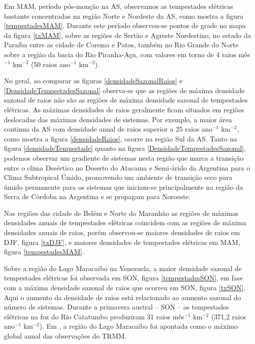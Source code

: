 Em MAM, período pós-monção na AS, observamos as tempestades elétricas bastante concentradas na região Norte e Nordeste da AS, como mostra a figura \ref{tempestadesMAM}. Durante este período observou-se pontos de grade no mapa da figura \ref{txMAM}, sobre as regiões de Sertão e Agreste Nordestino, no estado da Paraíba entre as cidade de Corema e Patos, também no Rio Grande do Norte sobre a região da bacia do Rio Piranha-Açu, com valores em torno de 4 raios mês$^{-1}$ km$^{-2}$ (50 raios ano$^{-1}$ km$^{-2}$).



No geral, ao comparar as figuras \ref{densidadeSazonalRaios} e \ref{DensidadeTempestadesSazonal} observa-se que as regiões de máxima densidade sazonal de raios não são as regiões de máxima densidade sazonal de tempestades elétricas. As máximas densidades de raios geralmente ficam situados em regiões deslocadas das máximas densidades de sistemas. Por exemplo, a maior área continua da AS com densidade anual de raios superior a 25 raios ano$^{-1}$ km$^{-2}$, como mostra a figura \ref{densidadeRaios}, ocorre na região Sul da AS. Tanto na figura \ref{densidadeTempestade} quanto na figura \ref{DensidadeTempestadesSazonal}, podemos observar um  gradiente de sistemas nesta região que marca a transição entre o clima Desértico no Deserto do Atacama e Semi-árido da Argentina para o Clima Subtropical Úmido, promovendo um ambiente de transição seco para úmido permanente para os sistemas que iniciam-se principalmente na região da Serra de Córdoba na Argentina e se propagam para Noroeste.

Nas regiões das cidade de Belém e Norte do Maranhão as regiões de máximas densidades anuais de tempestades elétricas coincidem com as regiões de máxima densidades anuais de raios, porém observou-se maiores densidades de raios em DJF, figura \ref{txDJF}, e maiores densidades de tempestades elétricas em MAM, figura \ref{tempestadesMAM}. 

Sobre a região do Lago Maracaibo na Venezuela, a maior densidade sazonal de tempestades elétricas foi observada em SON, figura \ref{tempestadesSON}, em fase com a máxima densidade sazonal de raios que ocorreu em SON, figura \ref{txSON}. Aqui o aumento da densidade de raios está relacionado ao aumento sazonal do número de sistemas. Durante a primavera austral -- SON --  as tempestades elétricas na foz do Rio Catatumbo produziram 31 raios mês$^{-1}$ km$^{-2}$ (371,2 raios ano$^{-1}$ km$^{-2}$). Em , a região do Lago Maracaibo foi apontada como o máximo global anual das observações do TRMM. 

